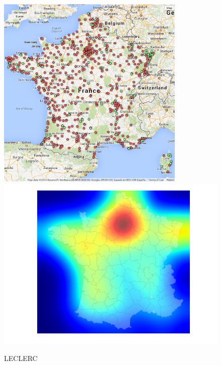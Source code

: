 \documentclass[11pt]{article}
\begin{document}
\begin{figure}[H]
    \caption{LECLERC}
	\centering
		\includegraphics[width=9cm]{images/maps_group_dots/LECLERC.png}
        \includegraphics[width=12.8cm]{images/maps_group_heatmaps/LECLERC.png}
\end{figure}
\end{document}
